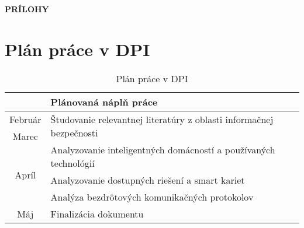 \documentclass[12pt,a4paper,oneside,openright]{report}
\begin{document}

\clearpage
{}
{}



\newpage
\thispagestyle{empty}
\vspace*{10cm}
\hspace*{5cm}
\textbf{\LARGE{PRÍLOHY}}

\addappheadtotoc
\def\appendixname{}
\appendix

\newpage
{}


\chapter{Plán práce v DPI}
	\begin{table}[h]
		\centering
		\caption{Plán práce v DPI}
		\label{t:plan_prace1}
\begin{tabular}{|c|l|}
	\hline
	& Plánovaná náplň práce \\ \hline
	\multirow{2}{*}{Február} & \multirow{4}{*}{Študovanie relevantnej literatúry z oblasti informačnej bezpečnosti} \\
	&  \\ \cline{1-1}
	\multirow{4}{*}{Marec} &  \\
	&  \\ \cline{2-2} 
	& \multirow{3}{*}{Analyzovanie inteligentných domácností a používaných technológií} \\
	&  \\ \cline{1-1}
	\multirow{5}{*}{Apríl} &  \\ \cline{2-2} 
	& \multirow{2}{*}{Analyzovanie dostupných riešení a smart kariet} \\
	&  \\ \cline{2-2} 
	& Analýza bezdrôtových komunikačných protokolov \\ \cline{2-2} 
	& \multirow{2}{*}{Finalizácia dokumentu} \\ \cline{1-1}
	Máj &  \\ \hline
\end{tabular}
	\end{table}
\end{document}
